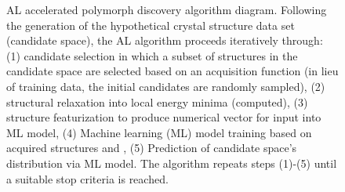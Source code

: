 \begin{figure}[!htb]
\centering
{}
\caption{\label{fig:all_diagram}
%
AL accelerated polymorph discovery algorithm diagram.
%
Following the generation of the hypothetical crystal structure data set (candidate space),
the AL algorithm proceeds iteratively through:
(1) candidate selection in which a subset of structures in the candidate space are selected based on an acquisition function (in lieu of training data, the initial candidates are randomly sampled),
(2) structural relaxation into local energy minima (\DHf computed),
(3) structure featurization to produce numerical vector for input into ML model,
(4) Machine learning (ML) model training based on acquired structures and \DHf,
(5) Prediction of candidate space's \DHf distribution via ML model.
%
The algorithm repeats steps (1)-(5) until a suitable stop criteria is reached.
}
\end{figure}


